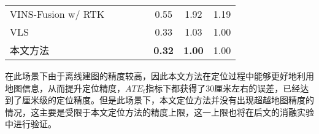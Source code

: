 \begin{table}
{\begin{tabular}{lccccccc}
VINS-Fusion w/ RTK &                                                                                &                     &                     &                     & 0.55          & 1.92          & 1.19          \\
VLS                &                                                                                &                     &                     &                     & 0.33          & 1.03          & 1.00          \\
本文方法               &                                                                                &                     &                     &                     & \cellcolor[HTML]{FFCCC9}\textbf{0.32} & \cellcolor[HTML]{FFCCC9}\textbf{1.00} & 1.00          \\ \bottomrule
\end{tabular}}
\label{tab:loc_4seasons_nh23}
\end{table}

在此场景下由于离线建图的精度较高，因此本文方法在定位过程中能够更好地利用地图信息，从而提升定位精度，$ATE_t$指标下都获得了30厘米左右的误差，已经达到了厘米级的定位精度。但是此场景下，本文定位方法并没有出现超越地图精度的情况，这主要是受限于本文定位方法的精度上限，这一上限也将在后文的消融实验中进行验证。

